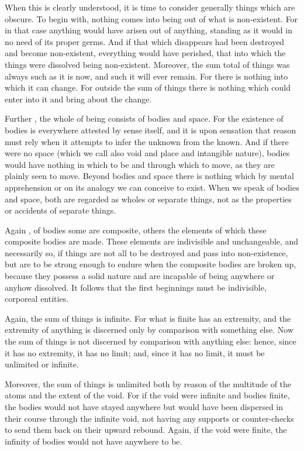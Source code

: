 \documentclass{stex}
\begin{document}
When this is clearly understood, it is time to consider generally things which are obscure.
To begin with, nothing comes into being out of what is non-existent.
For in that case anything would have arisen out of anything, standing as it would in no need of its proper germs.
And if that which disappears had been destroyed and become non-existent, everything would have perished, that into which the things were dissolved being non-existent.
Moreover, the sum total of things was always such as it is now, and such it will ever remain.
For there is nothing into which it can change.
For outside the sum of things there is nothing which could enter into it and bring about the change.

Further , the whole of being consists of bodies and space.
For the existence of bodies is everywhere attested by sense itself, and it is upon sensation that reason must rely when it attempts to infer the unknown from the known.
And if there were no space (which we call also void and place and intangible nature), bodies would have nothing in which to be and through which to move, as they are plainly seen to move.
Beyond bodies and space there is nothing which by mental apprehension or on its analogy we can conceive to exist.
When we speak of bodies and space, both are regarded as wholes or separate things, not as the properties or accidents of separate things.

Again , of bodies some are composite, others the elements of which these composite bodies are made.
These elements are indivisible and unchangeable, and necessarily so, if things are not all to be destroyed and pass into non-existence, but are to be strong enough to endure when the composite bodies are broken up, because they possess a solid nature and are incapable of being anywhere or anyhow dissolved.
It follows that the first beginnings must be indivisible, corporeal entities.

Again, the sum of things is infinite.
For what is finite has an extremity, and the extremity of anything is discerned only by comparison with something else.
Now the sum of things is not discerned by comparison with anything else: hence, since it has no extremity, it has no limit; and, since it has no limit, it must be unlimited or infinite.

Moreover, the sum of things is unlimited both by reason of the multitude of the atoms and the extent of the void.
For if the void were infinite and bodies finite, the bodies would not have stayed anywhere but would have been dispersed in their course through the infinite void, not having any supports or counter-checks to send them back on their upward rebound.
Again, if the void were finite, the infinity of bodies would not have anywhere to be.
\end{document}
